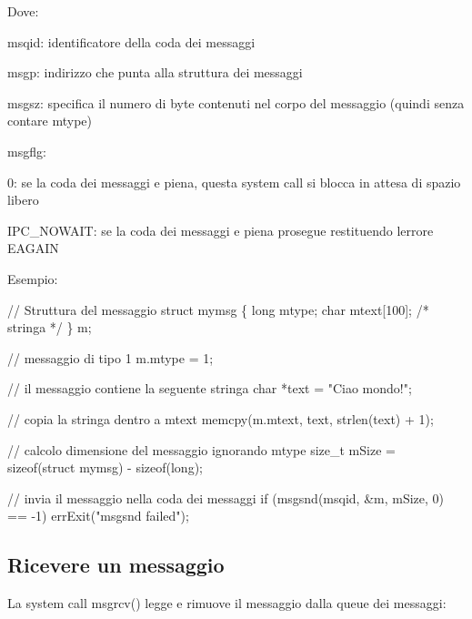 Dove\+:
\begin{DoxyItemize}
\item {\ttfamily msqid}\+: identificatore della coda dei messaggi
\item {\ttfamily msgp}\+: indirizzo che punta alla struttura dei messaggi
\item {\ttfamily msgsz}\+: specifica il numero di byte contenuti nel corpo del messaggio (quindi senza contare mtype)
\item {\ttfamily msgflg}\+:
\begin{DoxyItemize}
\item 0\+: se la coda dei messaggi e\textquotesingle{} piena, questa system call si blocca in attesa di spazio libero
\item {\ttfamily I\+P\+C\+\_\+\+N\+O\+W\+A\+IT}\+: se la coda dei messaggi e\textquotesingle{} piena prosegue restituendo l\textquotesingle{}errore E\+A\+G\+A\+IN
\end{DoxyItemize}
\end{DoxyItemize}

Esempio\+: 
\begin{DoxyCode}
\textcolor{comment}{// Struttura del messaggio}
\textcolor{keyword}{struct }mymsg \{
    \textcolor{keywordtype}{long} mtype;
    \textcolor{keywordtype}{char} mtext[100]; \textcolor{comment}{/* stringa */}
\} m;

\textcolor{comment}{// messaggio di tipo 1}
m.mtype = 1;

\textcolor{comment}{// il messaggio contiene la seguente stringa}
\textcolor{keywordtype}{char} *text = \textcolor{stringliteral}{"Ciao mondo!"};

\textcolor{comment}{// copia la stringa dentro a mtext}
memcpy(m.mtext, text, strlen(text) + 1);

\textcolor{comment}{// calcolo dimensione del messaggio ignorando mtype}
\textcolor{keywordtype}{size\_t} mSize = \textcolor{keyword}{sizeof}(\textcolor{keyword}{struct }mymsg) - sizeof(long);

\textcolor{comment}{// invia il messaggio nella coda dei messaggi}
\textcolor{keywordflow}{if} (msgsnd(msqid, &m, mSize, 0) == -1)
    errExit(\textcolor{stringliteral}{"msgsnd failed"});
\end{DoxyCode}


\subsection*{Ricevere un messaggio}

La system call {\ttfamily msgrcv()} legge e rimuove il messaggio dalla queue dei messaggi\+:


